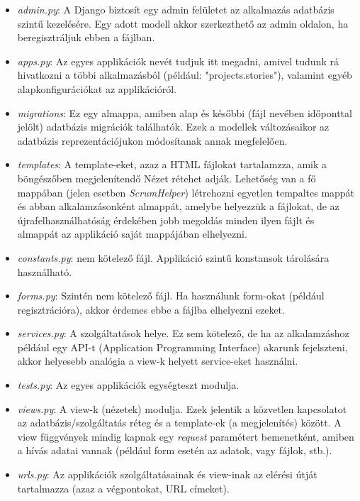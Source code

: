 \begin{itemize}
	\item \textit{admin.py}: A Django biztosít egy admin felületet az alkalmazás adatbázis szintű kezelésére. Egy adott modell akkor szerkezthető az admin oldalon, ha beregisztráljuk ebben a fájlban.
	\item \textit{apps.py}: Az egyes applikációk nevét tudjuk itt megadni, amivel tudunk rá hivatkozni a többi alkalmazásból (például: "projects.stories"), valamint egyéb alapkonfigurációkat az applikációról.
	\item \textit{migrations}: Ez egy almappa, amiben alap és későbbi (fájl nevében időponttal jelölt) adatbázis migrációk találhatók. Ezek a modellek változásaikor az adatbázis reprezentációjukon módosítanak annak megfelelően.
	\item \textit{templates}: A template-eket, azaz a HTML fájlokat tartalamzza, amik a böngészőben megjelenítendő Nézet rétehet adják. Lehetőség van a fő mappában (jelen esetben \textit{ScrumHelper}) létrehozni egyetlen tempaltes mappát és abban alkalamzásonként almappát, amelybe helyezzük a fájlokat,   de az újrafelhasználhatóság érdekében jobb megoldás minden ilyen fájlt és almappát az applikáció saját mappájában elhelyezni.
	\item \textit{constants.py}: nem kötelező fájl. Applikáció szintű konstansok tárolására használható.
	\item \textit{forms.py}: Szintén nem kötelező fájl. Ha használunk form-okat (például regisztrációra), akkor érdemes ebbe a fájlba elhelyezni ezeket.
	\item \textit{services.py}: A szolgáltatások helye. Ez sem kötelező, de ha az alkalamzáshoz például egy API-t (Application Programming Interface) akarunk fejelszteni, akkor helyesebb analógia a view-k helyett service-eket használni.
	\item \textit{tests.py}: Az egyes applikációk egységteszt modulja.
	\item \textit{views.py}: A view-k (nézetek) modulja. Ezek jelentik a közvetlen kapcsolatot az adatbázis/szolgáltatás réteg és a template-ek (a megjelenítés) között. A view függvények mindig kapnak egy \textit{request} paramétert bemenetként, amiben a hívás adatai vannak (például form esetén az adatok, vagy fájlok, stb.).
	\item \textit{urls.py}: Az applikációk szolgáltatásainak és view-inak az elérési útját tartalmazza (azaz a végpontokat, URL címeket).
\end{itemize}


